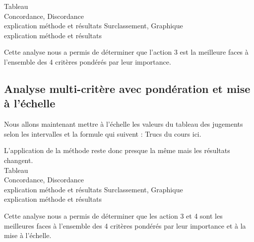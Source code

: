 \documentclass{article}
\begin{document}
Tableau\\
Concordance, Discordance\\ explication méthode et résultats
Surclassement, Graphique\\ explication méthode et résultats

Cette analyse nous a permis de déterminer que l'action 3 est la meilleure faces à l'ensemble des 4 critères pondérés par leur importance.

\subsection{Analyse multi-critère avec pondération et mise à l'échelle}
Nous allons maintenant mettre à l'échelle les valeurs du tableau des jugements selon les intervalles et la formule qui suivent : 
Trucs du cours ici.

L'application de la méthode reste donc presque la même mais les résultats changent.\\

Tableau\\
Concordance, Discordance\\ explication méthode et résultats
Surclassement, Graphique\\ explication méthode et résultats

Cette analyse nous a permis de déterminer que les action 3 et 4 sont les meilleures faces à l'ensemble des 4 critères pondérés par leur importance et à la mise à l'échelle.
\end{document}
